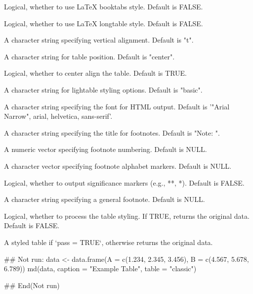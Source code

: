\documentclass[a4paper]{book}
\begin{document}
\begin{Arguments}
\begin{ldescription}
\item[\code{booktabs}] Logical, whether to use LaTeX booktabs style. Default is FALSE.

\item[\code{longtable}] Logical, whether to use LaTeX longtable style. Default is FALSE.

\item[\code{valign}] A character string specifying vertical alignment. Default is "t".

\item[\code{position}] A character string for table position. Default is "center".

\item[\code{centering}] Logical, whether to center align the table. Default is TRUE.

\item[\code{lightable\_options}] A character string for lightable styling options. Default is "basic".

\item[\code{html\_font}] A character string specifying the font for HTML output. Default is '"Arial Narrow", arial, helvetica, sans-serif'.

\item[\code{general\_title}] A character string specifying the title for footnotes. Default is "Note: ".

\item[\code{number}] A numeric vector specifying footnote numbering. Default is NULL.

\item[\code{alphabet}] A character vector specifying footnote alphabet markers. Default is NULL.

\item[\code{catout}] Logical, whether to output significance markers (e.g., **, *). Default is FALSE.

\item[\code{general}] A character string specifying a general footnote. Default is NULL.

\item[\code{pass}] Logical, whether to process the table styling. If TRUE, returns the original data. Default is FALSE.
\end{ldescription}
\end{Arguments}
%
\begin{Value}
A styled table if `pass = TRUE`, otherwise returns the original data.
\end{Value}
%
\begin{Examples}
\begin{ExampleCode}
## Not run: 
  data <- data.frame(A = c(1.234, 2.345, 3.456), B = c(4.567, 5.678, 6.789))
  md(data, caption = "Example Table", table = "classic")

## End(Not run)
\end{ExampleCode}
\end{Examples}
\end{document}
